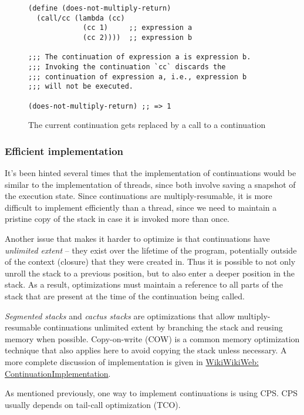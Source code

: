 \documentclass[]{article}
\begin{document}
\begin{figure}
  \centering
\begin{verbatim}
(define (does-not-multiply-return)
  (call/cc (lambda (cc)
             (cc 1)     ;; expression a
             (cc 2))))  ;; expression b

;;; The continuation of expression a is expression b.
;;; Invoking the continuation `cc` discards the
;;; continuation of expression a, i.e., expression b
;;; will not be executed.

(does-not-multiply-return) ;; => 1
\end{verbatim}
  \caption{The current continuation gets replaced by a call to a continuation}
  \label{fig:ccre}
\end{figure}

\subsubsection{Efficient implementation}
\label{sec:thre}

It's been hinted several times that the implementation of continuations would be similar to the implementation of threads, since both involve saving a snapshot of the execution state. Since continuations are multiply-resumable, it is more difficult to implement efficiently than a thread, since we need to maintain a pristine copy of the stack in case it is invoked more than once.

Another issue that makes it harder to optimize is that continuations have \textit{unlimited extent} -- they exist over the lifetime of the program, potentially outside of the context (closure) that they were created in. Thus it is possible to not only unroll the stack to a previous position, but to also enter a deeper position in the stack. As a result, optimizations must maintain a reference to all parts of the stack that are present at the time of the continuation being called.

\textit{Segmented stacks} and \textit{cactus stacks} are optimizations that allow multiply-resumable continuations unlimited extent by branching the stack and reusing memory when possible. Copy-on-write (COW) is a common memory optimization technique that also applies here to avoid copying the stack unless necessary. A more complete discussion of implementation is given in \href{https://wiki.c2.com/?ContinuationImplementation}{WikiWikiWeb: ContinuationImplementation}.

As mentioned previously, one way to implement continuations is using CPS. CPS usually depends on tail-call optimization (TCO).
\end{document}
